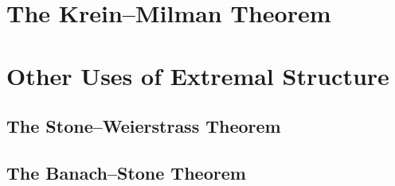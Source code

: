 \documentclass[10pt]{mypackage}
\begin{document}
\section{The Krein--Milman Theorem}%
\section{Other Uses of Extremal Structure}%
\subsection{The Stone--Weierstrass Theorem}%
\subsection{The Banach--Stone Theorem}%
\end{document}
